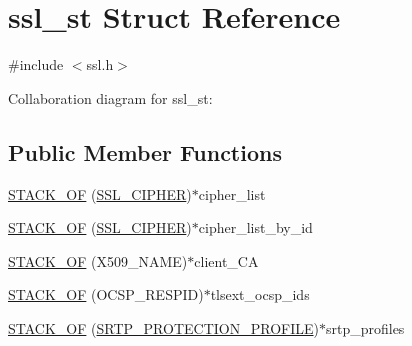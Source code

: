 \hypertarget{structssl__st}{\section{ssl\-\_\-st Struct Reference}
\label{structssl__st}
}


{\ttfamily \#include $<$ssl.\-h$>$}



Collaboration diagram for ssl\-\_\-st\-:
\subsection*{Public Member Functions}
\begin{DoxyCompactItemize}
\item 
\hyperlink{structssl__st_a5ae7275d4f26447455746397ac00232c}{S\-T\-A\-C\-K\-\_\-\-O\-F} (\hyperlink{ssl_8h_a548d7a5d565a9e0e9bd45c49f8c95701}{S\-S\-L\-\_\-\-C\-I\-P\-H\-E\-R})$\ast$cipher\-\_\-list
\item 
\hyperlink{structssl__st_ae926fcbe52e4174a9e5ef8fb88282e45}{S\-T\-A\-C\-K\-\_\-\-O\-F} (\hyperlink{ssl_8h_a548d7a5d565a9e0e9bd45c49f8c95701}{S\-S\-L\-\_\-\-C\-I\-P\-H\-E\-R})$\ast$cipher\-\_\-list\-\_\-by\-\_\-id
\item 
\hyperlink{structssl__st_a3e6334502ba71000f571d6ddb26b76c5}{S\-T\-A\-C\-K\-\_\-\-O\-F} (X509\-\_\-\-N\-A\-M\-E)$\ast$client\-\_\-\-C\-A
\item 
\hyperlink{structssl__st_acc0a36a4a42e6846ece423336c62ffce}{S\-T\-A\-C\-K\-\_\-\-O\-F} (O\-C\-S\-P\-\_\-\-R\-E\-S\-P\-I\-D)$\ast$tlsext\-\_\-ocsp\-\_\-ids
\item 
\hyperlink{structssl__st_aae6ff6d8a9ae850b7ea3f90fad7b0e5e}{S\-T\-A\-C\-K\-\_\-\-O\-F} (\hyperlink{ssl_8h_ad71374b5a3df5292d0722b703841292e}{S\-R\-T\-P\-\_\-\-P\-R\-O\-T\-E\-C\-T\-I\-O\-N\-\_\-\-P\-R\-O\-F\-I\-L\-E})$\ast$srtp\-\_\-profiles
\end{DoxyCompactItemize}
